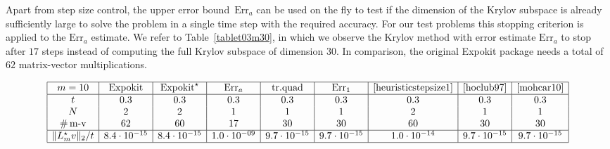 \documentclass[smallextended]{svjour3pre}%
\numberwithin{equation}{section}
\numberwithin{figure}{section}
\numberwithin{table}{section}
\newcommand{\ttol}{{\rm tol}}
\newcommand\tjnew[1]{{#1}}
\newcommand\Era{\mathrm{Err}_a}
\newcommand\Erone{\mathrm{Err}_1}
\begin{document}
Apart from step size control, \tjnew{the upper error bound}~$\Era$ can be used on the fly %
to test if the dimension of the Krylov subspace is already sufficiently large to solve the problem in a single time step with the required accuracy.
For our test problems this stopping criterion is applied to the $\Era$ estimate.%
We refer to Table~\ref{tablet03m30}, in which we observe the Krylov method with error estimate $\Era$ to stop after $17$ steps
instead of computing the full Krylov subspace of dimension $30$.
In comparison, the original Expokit package needs a total of $62$ matrix-vector multiplications.



\begin{table}
\centering
\caption{With a test setting similar to Table~\ref{table:stepsize10steps}, we now compute up to a fixed time $t=0.3$ and choose the number $ N $~of steps according to the step size control.
We use a tolerance $\ttol=10^{-8}$ and $m=30$.
For this problem we see a significant reduction
in the number of matrix-vector multiplications used for the estimate $\Era$ by the stopping critera described in the text.}
\label{tablet03m30}
\begin{equation*}
\begin{array}{|c|c|c|c|c|c|c|c|c|}\hline
{m=10}
& \text{Expokit}
& \text{Expokit}^{\star}
& \Era
& \text{tr.quad}
& \Erone
& \eqref{heuristicstepsize1}
& \text{\cite[Th. 4]{hoclub97}}
& \text{\cite[(20)]{mohcar10}}
\\\hline
t
&0.3&0.3&0.3&0.3&0.3&0.3&0.3&0.3 \\
 N
&2&2&1&1&1 &2&1&1\\
\text{\#\,m-v}
& 62 & 60 & 17 & 30 & 30 & 60 & 30 & 30\\\hline
\|L_m^{\star} v\|_2/t
& 8.4\cdot 10^{-15} & 8.4\cdot 10^{-15} & 1.0\cdot 10^{-09}  & 9.7\cdot 10^{-15} &
  9.7\cdot 10^{-15} & 1.0\cdot 10^{-14} & 9.7\cdot 10^{-15} & 9.7\cdot 10^{-15} \\\hline
\end{array}
\end{equation*}
\end{table}
\end{document}
